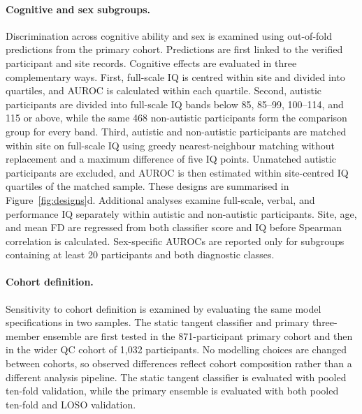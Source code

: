 \paragraph{\textbf{Cognitive and sex subgroups.}}
\label{par:cognitive-sex-subgroups}
Discrimination across cognitive ability and sex is examined using out-of-fold predictions from the primary cohort. Predictions are first linked to the verified participant and site records. Cognitive effects are evaluated in three complementary ways. First, full-scale IQ is centred within site and divided into quartiles, and AUROC is calculated within each quartile. Second, autistic participants are divided into full-scale IQ bands below 85, 85--99, 100--114, and 115 or above, while the same 468 non-autistic participants form the comparison group for every band. Third, autistic and non-autistic participants are matched within site on full-scale IQ using greedy nearest-neighbour matching without replacement and a maximum difference of five IQ points. Unmatched autistic participants are excluded, and AUROC is then estimated within site-centred IQ quartiles of the matched sample. These designs are summarised in Figure~\ref{fig:designs}d. Additional analyses examine full-scale, verbal, and performance IQ separately within autistic and non-autistic participants. Site, age, and mean FD are regressed from both classifier score and IQ before Spearman correlation is calculated. Sex-specific AUROCs are reported only for subgroups containing at least 20 participants and both diagnostic classes.

\paragraph{\textbf{Cohort definition.}}
\label{par:cohort-definition}
Sensitivity to cohort definition is examined by evaluating the same model specifications in two samples. The static tangent classifier and primary three-member ensemble are first tested in the 871-participant primary cohort and then in the wider QC cohort of 1,032 participants. No modelling choices are changed between cohorts, so observed differences reflect cohort composition rather than a different analysis pipeline. The static tangent classifier is evaluated with pooled ten-fold validation, while the primary ensemble is evaluated with both pooled ten-fold and LOSO validation.

